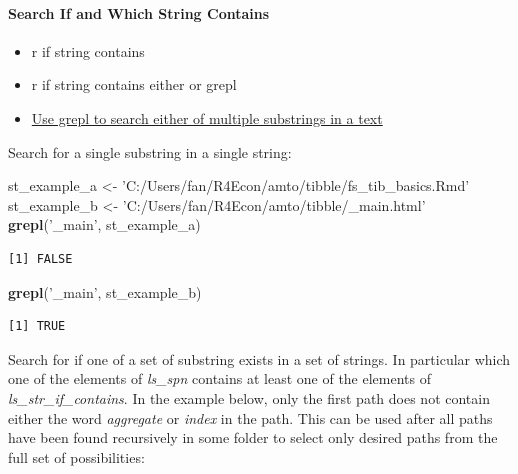 \documentclass[
]{book}
\newenvironment{Shaded}{\begin{snugshade}}{\end{snugshade}}
\newcommand{\KeywordTok}[1]{\textcolor[rgb]{0.13,0.29,0.53}{\textbf{#1}}}
\newcommand{\NormalTok}[1]{#1}
\newcommand{\StringTok}[1]{\textcolor[rgb]{0.31,0.60,0.02}{#1}}
\providecommand{\tightlist}{%
  \setlength{\itemsep}{0pt}\setlength{\parskip}{0pt}}
\begin{document}
\hypertarget{search-if-and-which-string-contains}{%
\paragraph{Search If and Which String Contains}\label{search-if-and-which-string-contains}}

\begin{itemize}
\tightlist
\item
  r if string contains
\item
  r if string contains either or grepl
\item
  \href{https://stackoverflow.com/a/26319765/8280804}{Use grepl to search either of multiple substrings in a text}
\end{itemize}

Search for a single substring in a single string:

\begin{Shaded}
\begin{Highlighting}[]
\NormalTok{st_example_a <-}\StringTok{ 'C:/Users/fan/R4Econ/amto/tibble/fs_tib_basics.Rmd'}
\NormalTok{st_example_b <-}\StringTok{ 'C:/Users/fan/R4Econ/amto/tibble/_main.html'}
\KeywordTok{grepl}\NormalTok{(}\StringTok{'_main'}\NormalTok{, st_example_a)}
\end{Highlighting}
\end{Shaded}

\begin{verbatim}
[1] FALSE
\end{verbatim}

\begin{Shaded}
\begin{Highlighting}[]
\KeywordTok{grepl}\NormalTok{(}\StringTok{'_main'}\NormalTok{, st_example_b)}
\end{Highlighting}
\end{Shaded}

\begin{verbatim}
[1] TRUE
\end{verbatim}

Search for if one of a set of substring exists in a set of strings. In particular which one of the elements of \emph{ls\_spn} contains at least one of the elements of \emph{ls\_str\_if\_contains}. In the example below, only the first path does not contain either the word \emph{aggregate} or \emph{index} in the path. This can be used after all paths have been found recursively in some folder to select only desired paths from the full set of possibilities:
\end{document}
